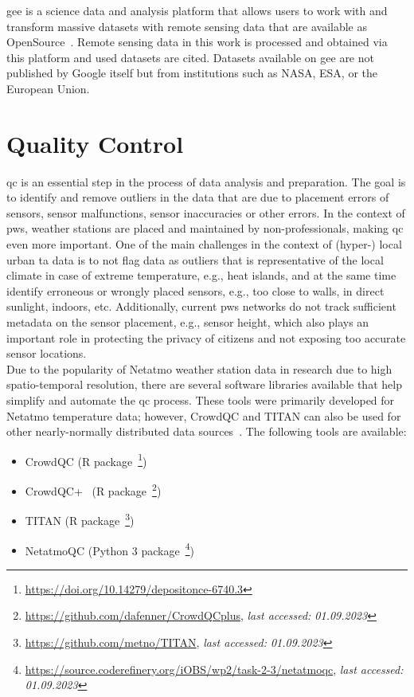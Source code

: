 \gls{gee} is a science data and analysis platform that allows users to work with and transform massive datasets with remote sensing data that are available as OpenSource~\cite{gorelick2017google}. Remote sensing data in this work is processed and obtained via this platform and used datasets are cited. Datasets available on \gls{gee} are not published by Google itself but from institutions such as NASA, ESA, or the European Union.

\section{Quality Control}
\label{sec:quality control}

\gls{qc} is an essential step in the process of data analysis and preparation. The goal is to identify and remove outliers in the data that are due to placement errors of sensors, sensor malfunctions, sensor inaccuracies or other errors. In the context of \gls{pws}, weather stations are placed and maintained by non-professionals, making \gls{qc} even more important. One of the main challenges in the context of (hyper-) local urban \gls{ta} data is to not flag data as outliers that is representative of the local climate in case of extreme temperature, e.g., heat islands, and at the same time identify erroneous or wrongly placed sensors, e.g., too close to walls, in direct sunlight, indoors, etc. Additionally, current \gls{pws} networks do not track sufficient metadata on the sensor placement, e.g., sensor height, which also plays an important role in protecting the privacy of citizens and not exposing too accurate sensor locations.\\
Due to the popularity of Netatmo weather station data in research due to high spatio-temporal resolution, there are several software libraries available that help simplify and automate the \gls{qc} process. These tools were primarily developed for Netatmo temperature data; however, CrowdQC and TITAN can also be used for other nearly-normally distributed data sources~\cite{hahn2022observations}. The following tools are available:

\begin{itemize}
    \item CrowdQC (R package~\footnote{\url{https://doi.org/10.14279/depositonce-6740.3}})
    \item CrowdQC+~\cite{fenner2021crowdqc+} (R package~\footnote{\url{https://github.com/dafenner/CrowdQCplus}, \textit{last accessed: 01.09.2023}})
    \item TITAN (R package~\footnote{\url{https://github.com/metno/TITAN}, \textit{last accessed: 01.09.2023}})
    \item NetatmoQC (Python 3 package~\footnote{\url{https://source.coderefinery.org/iOBS/wp2/task-2-3/netatmoqc}, \textit{last accessed: 01.09.2023}})
\end{itemize}

